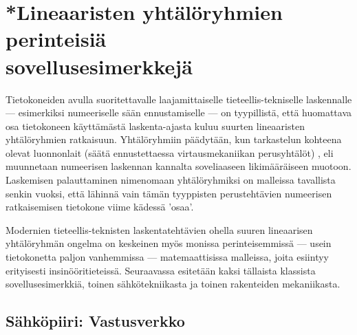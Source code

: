 \section[Lineaaristen yhtälöryhmien sovellusesimerkkejä]{*Lineaaristen yhtälöryhmien 
perinteisiä \\ sovellusesimerkkejä} 
\label{yhtälöryhmät} 
\alku

Tietokoneiden avulla suoritettavalle laajamittaiselle tieteellis-tekniselle laskennalle 
--- esimerkiksi numeeriselle sään ennustamiselle --- on tyypillistä, että huomattava osa 
tietokoneen käyttämästä laskenta-ajasta kuluu suurten lineaaristen yhtälöryhmien ratkaisuun. 
Yhtälöryhmiin päädytään, kun tarkastelun kohteena olevat luonnonlait (säätä ennustettaessa 
virtausmekaniikan perusyhtälöt) , eli muunnetaan numeerisen laskennan 
kannalta soveliaaseen likimääräiseen muotoon. Laskemisen palauttaminen nimenomaan
 yhtälöryhmiksi on malleissa tavallista senkin vuoksi, että lähinnä
vain tämän tyyppisten perustehtävien numeerisen ratkaisemisen tietokone viime kädessä 'osaa'.

Modernien tieteellis-teknisten laskentatehtävien ohella suuren lineaarisen yhtälöryhmän ongelma
on keskeinen myös monissa perinteisemmissä --- usein tietokonetta paljon vanhemmissa --- 
matemaattisissa malleissa, joita esiintyy erityisesti insinööritieteissä. Seuraavassa esitetään
kaksi tällaista klassista sovellusesimerkkiä, toinen sähkötekniikasta ja toinen rakenteiden 
mekaniikasta.

\subsection*{Sähköpiiri: Vastusverkko}

